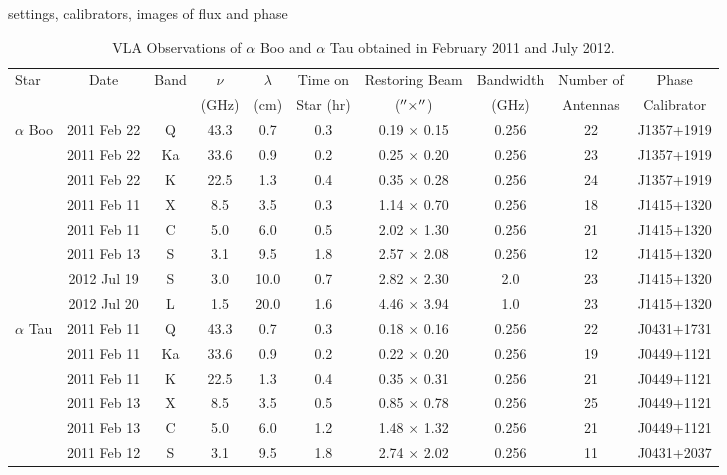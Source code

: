 settings, calibrators, images of flux and phase

\begin{landscape}
\begin{table}
\begin{center}
\caption[VLA Observations of $\alpha$ Boo and $\alpha$ Tau.]
{VLA Observations of $\alpha$ Boo and $\alpha$ Tau obtained in February 2011 and July 2012.}
\begin{tabular}{lccccccccc}
\hline
\hline
\rule{0pt}{2.5ex}Star & Date & Band & $\nu$	& $\lambda$& Time on& Restoring Beam			& Bandwidth & Number of&Phase\\
	 & 		&  & (GHz)		& (cm)		& Star (hr)		  & ($^{\prime\prime} \times ^{\prime\prime}$)& (GHz)		& Antennas&Calibrator\\
\hline
\rule{0pt}{2.5ex} $\alpha$ Boo 	& 2011 Feb 22 & Q	& 43.3 & 0.7		& 0.3 	&0.19 $\times$ 0.15& 0.256	&22& J1357+1919  \\
				& 2011 Feb 22 & Ka	& 33.6 & 0.9		& 0.2 	&0.25 $\times$ 0.20& 0.256 	&23&J1357+1919  \\
				& 2011 Feb 22 & K	& 22.5 & 1.3		& 0.4	&0.35 $\times$ 0.28& 0.256 	&24&J1357+1919  \\
				& 2011 Feb 11 & X	& 8.5  & 3.5		& 0.3 	&1.14 $\times$ 0.70& 0.256 	&18&J1415+1320  \\
				& 2011 Feb 11 & C	& 5.0  & 6.0 		& 0.5	&2.02 $\times$ 1.30& 0.256 	&21& J1415+1320 \\
				& 2011 Feb 13 & S	& 3.1  & 9.5 		& 1.8 	&2.57 $\times$ 2.08& 0.256 	&12& J1415+1320 \\
				& 2012 Jul 19 & S	& 3.0  & 10.0 		& 0.7 	&2.82 $\times$ 2.30& 2.0		&23& J1415+1320 \\
				& 2012 Jul 20 & L	& 1.5  & 20.0		& 1.6 	&4.46 $\times$ 3.94& 1.0		&23& J1415+1320 \\
\hline
\rule{0pt}{2.5ex}  $\alpha$ Tau	& 2011 Feb 11 & Q	& 43.3 & 0.7 		& 0.3 	&0.18 $\times$ 0.16& 0.256 	&22&  J0431+1731\\
				& 2011 Feb 11 & Ka	& 33.6 & 0.9 		& 0.2 	&0.22 $\times$ 0.20& 0.256 	&19&  J0449+1121\\
				& 2011 Feb 11 & K	& 22.5 & 1.3 		& 0.4 	&0.35 $\times$ 0.31& 0.256 	&21&  J0449+1121\\
				& 2011 Feb 13 & X	&  8.5 & 3.5 		& 0.5	&0.85 $\times$ 0.78& 0.256 	&25&  J0449+1121\\
				& 2011 Feb 13 & C	&  5.0 & 6.0 		& 1.2	&1.48 $\times$ 1.32& 0.256 	&21&  J0449+1121\\
				& 2011 Feb 12 & S	&  3.1 & 9.5 		& 1.8 	&2.74 $\times$ 2.02& 0.256 	&11&  J0431+2037\\ 
\hline
\end{tabular}
\label{tab:1}
\end{center}
\end{table}
\end{landscape}

